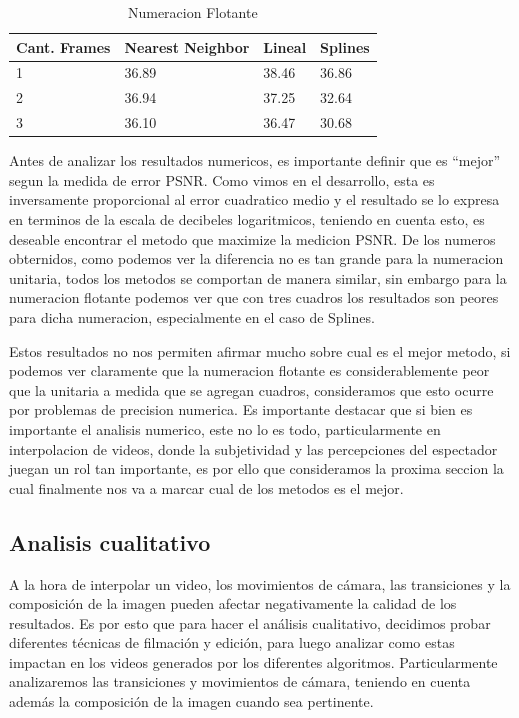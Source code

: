\begin{table}[h]
\centering
\caption{Numeracion Flotante}
\label{my-label}
\begin{tabular}{llll}
\hline
Cant. Frames & Nearest Neighbor & Lineal & Splines \\ \hline
1            & 36.89            & 38.46  & 36.86   \\
2            & 36.94            & 37.25  & 32.64   \\
3            & 36.10            & 36.47  & 30.68   \\ \hline
\end{tabular}
\end{table}

\newpage

Antes de analizar los resultados numericos, es importante definir que es "`mejor"' segun la medida de error PSNR. Como vimos en el desarrollo, esta es inversamente proporcional al error cuadratico medio y el resultado se lo expresa en terminos de la escala de decibeles logaritmicos, teniendo en cuenta esto, es deseable encontrar el metodo que maximize la medicion PSNR. De los numeros obternidos, como podemos ver la diferencia no es tan grande para la numeracion unitaria, todos los metodos se comportan de manera similar, sin embargo para la numeracion flotante podemos ver que con tres cuadros los resultados son peores para dicha numeracion, especialmente en el caso de Splines.

Estos resultados no nos permiten afirmar mucho sobre cual es el mejor metodo, si podemos ver claramente que la numeracion flotante es considerablemente peor que la unitaria a medida que se agregan cuadros, consideramos que esto ocurre por problemas de precision numerica. Es importante destacar que si bien es importante el analisis numerico, este no lo es todo, particularmente en interpolacion de videos, donde la subjetividad y las percepciones del espectador juegan un rol tan importante, es por ello que consideramos la proxima seccion la cual finalmente nos va a marcar cual de los metodos es el mejor.

\subsection{Analisis cualitativo}

A la hora de interpolar un video, los movimientos de cámara, las transiciones y la composición de la imagen pueden afectar negativamente la calidad de los resultados. Es por esto que para hacer el análisis cualitativo, decidimos probar diferentes técnicas de filmación y edición, para luego analizar como estas impactan en los videos generados por los diferentes algoritmos. Particularmente analizaremos las transiciones y movimientos de cámara, teniendo en cuenta además la composición de la imagen cuando sea pertinente.

